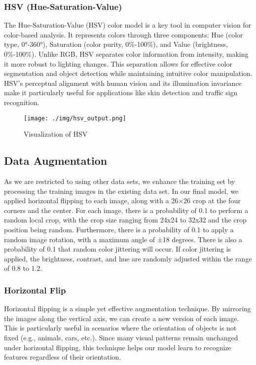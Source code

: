 \documentclass[a4paper,11pt]{article}
\begin{document}
\subsubsection{HSV (Hue-Saturation-Value)}
The Hue-Saturation-Value (HSV) color model is a key tool in computer vision for color-based analysis. It represents colors through three components: Hue (color type, 0°-360°), Saturation (color purity, 0\%-100\%), and Value (brightness, 0\%-100\%). Unlike RGB, HSV separates color information from intensity, making it more robust to lighting changes. This separation allows for effective color segmentation and object detection while maintaining intuitive color manipulation. HSV's perceptual alignment with human vision and its illumination invariance make it particularly useful for applications like skin detection and traffic sign recognition.

\begin{figure}[H]
    \centering
    \texttt{[image: ./img/hsv\_output.png]}
    \caption[Label count]{Visualization of HSV}
    \label{fig:example}
\end{figure}


\subsection{Data Augmentation}
As we are restricted to using other data sets, we enhance the training set by processing the training images in the existing data set. In our final model, we applied horizontal flipping to each image, along with a 26×26 crop at the four corners and the center. For each image, there is a probability of 0.1 to perform a random local crop, with the crop size ranging from 24x24 to 32x32 and the crop position being random. Furthermore, there is a probability of 0.1 to apply a random image rotation, with a maximum angle of ±18 degrees. There is also a probability of 0.1 that random color jittering will occur. If color jittering is applied, the brightness, contrast, and hue are randomly adjusted within the range of 0.8 to 1.2.
\subsubsection{Horizontal Flip}
Horizontal flipping is a simple yet effective augmentation technique. By mirroring the images along the vertical axis, we can create a new version of each image. This is particularly useful in scenarios where the orientation of objects is not fixed (e.g., animals, cars, etc.). Since many visual patterns remain unchanged under horizontal flipping, this technique helps our model learn to recognize features regardless of their orientation.
\end{document}
